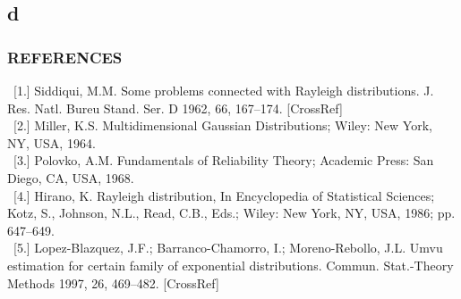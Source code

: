 \documentclass{beamer}
\begin{document}
\subsection{d}
\begin{frame}
\frametitle{REFERENCES}
\footnotesize
\label{d}
\ [1.] Siddiqui, M.M. Some problems connected with Rayleigh distributions. J. Res. Natl. Bureu Stand. Ser. D 1962,
66, 167–174. [CrossRef]
\\\ [2.] Miller, K.S. Multidimensional Gaussian Distributions; Wiley: New York, NY, USA, 1964.
\\\ [3.] Polovko, A.M. Fundamentals of Reliability Theory; Academic Press: San Diego, CA, USA, 1968.
\\\ [4.] Hirano, K. Rayleigh distribution, In Encyclopedia of Statistical Sciences; Kotz, S., Johnson, N.L., Read, C.B., Eds.;
Wiley: New York, NY, USA, 1986; pp. 647–649.
\\\ [5.] Lopez-Blazquez, J.F.; Barranco-Chamorro, I.; Moreno-Rebollo, J.L. Umvu estimation for certain family of
exponential distributions. Commun. Stat.-Theory Methods 1997, 26, 469–482. [CrossRef]

\end{frame}
\end{document}
